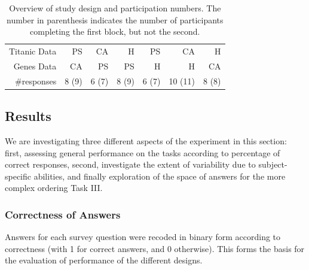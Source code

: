 \documentclass[journal]{vgtc}\usepackage{graphicx, color}
\begin{document}
\begin{table}[htbp]
\centering
\begin{tabular}{rrrrrrr}
Titanic Data & PS & CA & H & PS & CA & H \\ 
Genes Data & CA & PS & PS & H& H & CA \\ \hline
\#responses &  8 (9) &  6 (7) &  8 (9) &  6 (7) & 10 (11) & 8 (8)\\ 
\end{tabular}
\caption{\label{tab:designs} Overview of study design and participation numbers. The number in parenthesis indicates the number of participants completing the first block, but not the second.}
\end{table}



\subsection{Results}\label{results}
We are investigating three different aspects  of the experiment in this section: first,  assessing general performance on the tasks according to percentage of correct responses, second, investigate the extent of variability due to subject-specific abilities, and finally exploration of the space of answers for the more complex ordering Task III.
\subsubsection*{Correctness of Answers}
Answers for each survey question  were recoded in binary form according to correctness (with 1 for correct answers, and 0 otherwise). This forms the basis for the evaluation of performance of the different designs.

\end{document}
